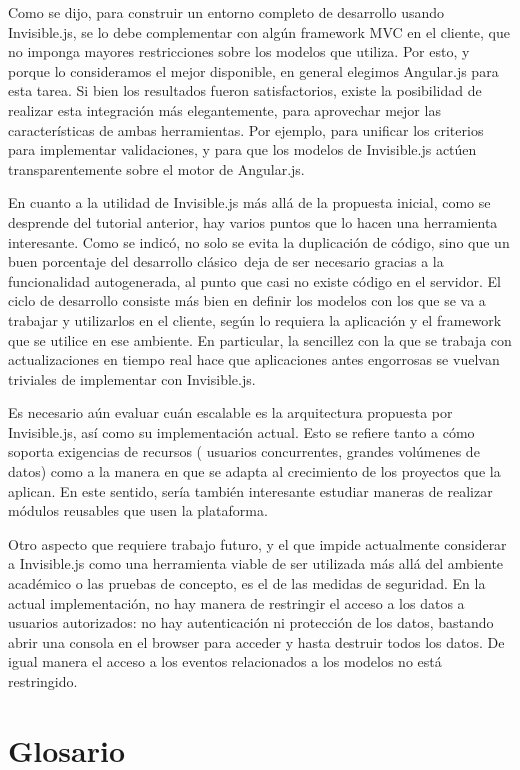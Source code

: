 \documentclass[doc,helv,longtable]{article}
\begin{document}
Como se dijo, para construir un entorno completo de desarrollo usando Invisible.js, se lo debe complementar con algún framework MVC en el cliente, que no imponga mayores restricciones sobre los modelos que utiliza. Por esto, y porque lo consideramos el mejor disponible, en general elegimos Angular.js para esta tarea. Si bien los resultados fueron satisfactorios, existe la posibilidad de realizar esta integración más elegantemente, para aprovechar mejor las características de ambas herramientas. Por ejemplo, para unificar los criterios para implementar validaciones, y para que los modelos de Invisible.js actúen transparentemente sobre el motor de Angular.js.

En cuanto a la utilidad de Invisible.js más allá de la propuesta inicial, como se desprende del tutorial anterior, hay varios puntos que lo hacen una herramienta interesante. Como se indicó, no solo se evita la duplicación de código, sino que un buen porcentaje del desarrollo clásico deja de ser necesario gracias a la funcionalidad autogenerada, al punto que casi no existe código en el servidor. El ciclo de desarrollo consiste más bien en definir los modelos con los que se va a trabajar y utilizarlos en el cliente, según lo requiera la aplicación y el framework que se utilice en ese ambiente. En particular, la sencillez con la que se trabaja con actualizaciones en tiempo real hace que aplicaciones antes engorrosas se vuelvan triviales de implementar con Invisible.js.

Es necesario aún evaluar cuán escalable es la arquitectura propuesta por Invisible.js, así como su implementación actual. Esto se refiere tanto a cómo soporta exigencias de recursos ( usuarios concurrentes, grandes volúmenes de datos) como a la manera en que se adapta al crecimiento de los proyectos que la aplican. En este sentido, sería también interesante estudiar maneras de realizar módulos reusables que usen la plataforma.

Otro aspecto que requiere trabajo futuro, y el que impide actualmente considerar a Invisible.js como una herramienta viable de ser utilizada más allá del ambiente académico o las pruebas de concepto, es el de las medidas de seguridad. En la actual implementación, no hay manera de restringir el acceso a los datos a usuarios autorizados: no hay autenticación ni protección de los datos, bastando abrir una consola en el browser para acceder y hasta destruir todos los datos. De igual manera el acceso a los eventos relacionados a los modelos no está restringido.\section{Glosario}
\end{document}
